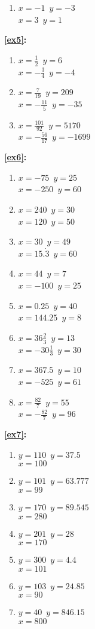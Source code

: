 \documentclass[a4paper,11pt]{article}
\begin{document}
\begin{multicols}{3}
\begin{enumerate}
\item $x=-1$~$y=-3$\\$x=3$~$y=1$
\end{enumerate}
\textbf{\ref{ex5}:}
\begin{enumerate}
\item $x=\frac{1}{2}$~$y=6$\\$x=-\frac{3}{4}$~$y=-4$
\item $x=\frac{7}{19}$~$y=209$\\$x=-\frac{11}{5}$~$y=-35$
\item $x=\frac{101}{92}$~$y=5170$\\$x=-\frac{56}{17}$~$y=-1699$
\end{enumerate}
\textbf{\ref{ex6}:}	
\begin{enumerate}
\item $x=-75$~$y=25$\\$x=-250$~$y=60$
\item $x=240$~$y=30$\\$x=120$~$y=50$
\item $x=30$~$y=49$\\$x=15.\dot{3}$~$y=60$
\item $x=44$~$y=7$\\$x=-100$~$y=25$
\item $x=0.25$~$y=40$\\$x=144.25$~$y=8$
\item $x=36\frac{2}{3}$~$y=13$\\$x=-30\frac{1}{3}$~$y=30$
\item $x=367.5$~$y=10$\\$x=-525$~$y=61$
\item $x=\frac{82}{7}$~$y=55$\\$x=-\frac{82}{7}$~$y=96$
\end{enumerate}
\textbf{\ref{ex7}:}
\begin{enumerate}
\item $y=110$~$y=37.5$\\$x=100$
\item $y=101$~$y=63.777$\\$x=99$
\item $y=170$~$y=89.545$\\$x=280$
\item $y=201$~$y=28$\\$x=170$
\item $y=300$~$y=4.4$\\$x=101$
\item $y=103$~$y=24.85$\\$x=90$
\item $y=40$~$y=846.15$\\$x=800$

\end{enumerate}
\end{multicols}
\end{document}

